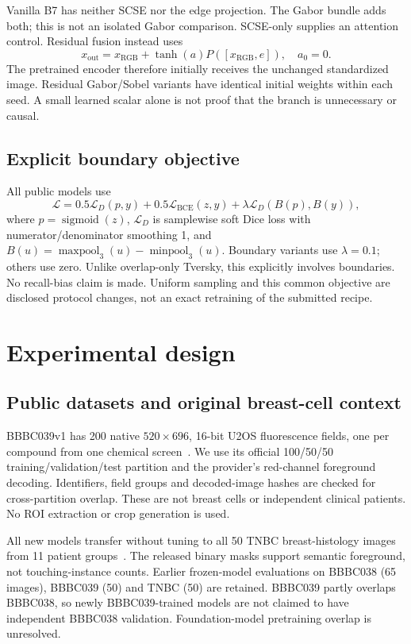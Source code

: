 \documentclass{article}
\begin{document}
Vanilla B7 has neither SCSE nor the edge projection. The Gabor bundle adds both; this is not an isolated Gabor comparison. SCSE-only supplies an attention control. Residual fusion instead uses
\begin{equation}
 x_{\mathrm{out}}=x_{\mathrm{RGB}}+\tanh(a)P([x_{\mathrm{RGB}},e]),\quad a_0=0.
\end{equation}
The pretrained encoder therefore initially receives the unchanged standardized image. Residual Gabor/Sobel variants have identical initial weights within each seed. A small learned scalar alone is not proof that the branch is unnecessary or causal.

\subsection{Explicit boundary objective}
All public models use
\begin{equation}
 \mathcal L=0.5\mathcal L_D(p,y)+0.5\mathcal L_{\mathrm{BCE}}(z,y)
 +\lambda\mathcal L_D(B(p),B(y)),
\end{equation}
where $p=\operatorname{sigmoid}(z)$, $\mathcal L_D$ is samplewise soft Dice loss with numerator/denominator smoothing 1, and $B(u)=\operatorname{maxpool}_3(u)-\operatorname{minpool}_3(u)$. Boundary variants use $\lambda=0.1$; others use zero. Unlike overlap-only Tversky, this explicitly involves boundaries. No recall-bias claim is made. Uniform sampling and this common objective are disclosed protocol changes, not an exact retraining of the submitted recipe.

\section{Experimental design}
\subsection{Public datasets and original breast-cell context}
BBBC039v1 has 200 native $520\times696$, 16-bit U2OS fluorescence fields, one per compound from one chemical screen~\cite{bbbc}. We use its official 100/50/50 training/validation/test partition and the provider's red-channel foreground decoding. Identifiers, field groups and decoded-image hashes are checked for cross-partition overlap. These are not breast cells or independent clinical patients. No ROI extraction or crop generation is used.

All new models transfer without tuning to all 50 TNBC breast-histology images from 11 patient groups~\cite{naylor}. The released binary masks support semantic foreground, not touching-instance counts. Earlier frozen-model evaluations on BBBC038 (65 images), BBBC039 (50) and TNBC (50) are retained. BBBC039 partly overlaps BBBC038, so newly BBBC039-trained models are not claimed to have independent BBBC038 validation. Foundation-model pretraining overlap is unresolved.
\end{document}
